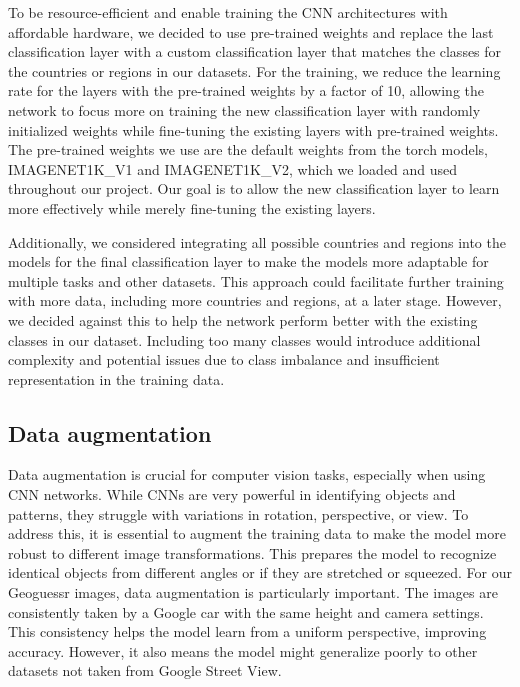 To be resource-efficient and enable training the CNN architectures with
affordable hardware, we decided to use pre-trained weights and replace
the last classification layer with a custom classification layer that
matches the classes for the countries or regions in our datasets. For
the training, we reduce the learning rate for the layers with the
pre-trained weights by a factor of 10, allowing the network to focus
more on training the new classification layer with randomly initialized
weights while fine-tuning the existing layers with pre-trained weights.
The pre-trained weights we use are the default weights from the torch
models, IMAGENET1K\_V1 and IMAGENET1K\_V2, which we loaded and used
throughout our project. Our goal is to allow the new classification
layer to learn more effectively while merely fine-tuning the existing
layers.

Additionally, we considered integrating all possible countries and
regions into the models for the final classification layer to make the
models more adaptable for multiple tasks and other datasets. This
approach could facilitate further training with more data, including
more countries and regions, at a later stage. However, we decided
against this to help the network perform better with the existing
classes in our dataset. Including too many classes would introduce
additional complexity and potential issues due to class imbalance and
insufficient representation in the training data.

\subsection{Data augmentation}\label{data-augmentation}

Data augmentation is crucial for computer vision tasks, especially when
using CNN networks. While CNNs are very powerful in identifying objects
and patterns, they struggle with variations in rotation, perspective, or
view. To address this, it is essential to augment the training data to
make the model more robust to different image transformations. This
prepares the model to recognize identical objects from different angles
or if they are stretched or squeezed. For our Geoguessr images, data
augmentation is particularly important. The images are consistently
taken by a Google car with the same height and camera settings. This
consistency helps the model learn from a uniform perspective, improving
accuracy. However, it also means the model might generalize poorly to
other datasets not taken from Google Street View.

